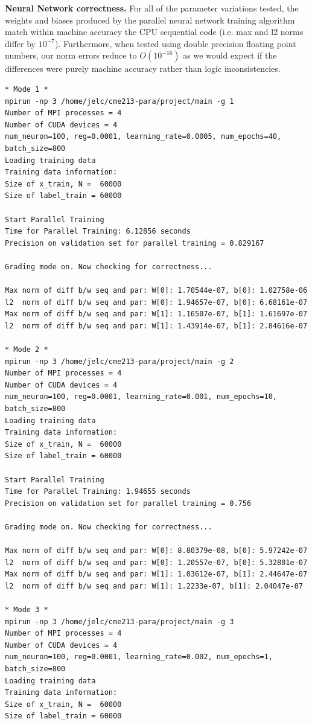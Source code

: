 \documentclass[12pt,letterpaper,twoside]{article}
\begin{document}
\textbf{Neural Network correctness.} For all of the parameter variations tested, the 
weights and biases produced by the parallel neural network training algorithm match 
within machine accuracy the CPU sequential code (i.e. max and l2 norms differ
by $10^{-7}$). Furthermore, when tested using double precision floating point 
numbers, our norm errors reduce to $O(10^{-16})$ as we would expect if the 
differences were purely machine accuracy rather than logic inconsistencies.   

\begin{verbatim}
* Mode 1 *
mpirun -np 3 /home/jelc/cme213-para/project/main -g 1
Number of MPI processes = 4
Number of CUDA devices = 4
num_neuron=100, reg=0.0001, learning_rate=0.0005, num_epochs=40, batch_size=800
Loading training data
Training data information:
Size of x_train, N =  60000
Size of label_train = 60000

Start Parallel Training
Time for Parallel Training: 6.12856 seconds
Precision on validation set for parallel training = 0.829167

Grading mode on. Now checking for correctness...

Max norm of diff b/w seq and par: W[0]: 1.70544e-07, b[0]: 1.02758e-06
l2  norm of diff b/w seq and par: W[0]: 1.94657e-07, b[0]: 6.68161e-07
Max norm of diff b/w seq and par: W[1]: 1.16507e-07, b[1]: 1.61697e-07
l2  norm of diff b/w seq and par: W[1]: 1.43914e-07, b[1]: 2.84616e-07

* Mode 2 *
mpirun -np 3 /home/jelc/cme213-para/project/main -g 2
Number of MPI processes = 4
Number of CUDA devices = 4
num_neuron=100, reg=0.0001, learning_rate=0.001, num_epochs=10, batch_size=800
Loading training data
Training data information:
Size of x_train, N =  60000
Size of label_train = 60000

Start Parallel Training
Time for Parallel Training: 1.94655 seconds
Precision on validation set for parallel training = 0.756

Grading mode on. Now checking for correctness...

Max norm of diff b/w seq and par: W[0]: 8.80379e-08, b[0]: 5.97242e-07
l2  norm of diff b/w seq and par: W[0]: 1.20557e-07, b[0]: 5.32801e-07
Max norm of diff b/w seq and par: W[1]: 1.03612e-07, b[1]: 2.44647e-07
l2  norm of diff b/w seq and par: W[1]: 1.2233e-07, b[1]: 2.04047e-07

* Mode 3 *
mpirun -np 3 /home/jelc/cme213-para/project/main -g 3
Number of MPI processes = 4
Number of CUDA devices = 4
num_neuron=100, reg=0.0001, learning_rate=0.002, num_epochs=1, batch_size=800
Loading training data
Training data information:
Size of x_train, N =  60000
Size of label_train = 60000


\end{verbatim}
\end{document}
